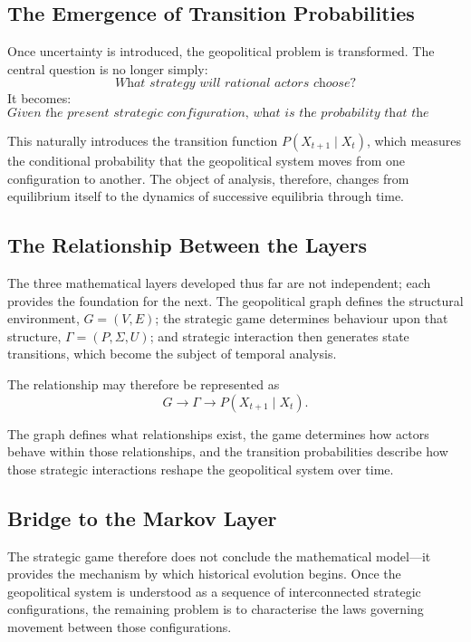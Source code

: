 \documentclass[11pt,openany]{book}
\theoremstyle{plain}
\theoremstyle{definition}
\begin{document}
\subsection*{The Emergence of Transition Probabilities}

Once uncertainty is introduced, the geopolitical problem is transformed. The central question is no longer simply:
\[
\textit{What strategy will rational actors choose?}
\]
It becomes:
\[
\textit{Given the present strategic configuration, what is the probability that the system evolves into each admissible future state?}
\]

This naturally introduces the transition function \(P(X_{t+1}\mid X_t)\), which measures the conditional probability that the geopolitical system moves from one configuration to another. The object of analysis, therefore, changes from equilibrium itself to the dynamics of successive equilibria through time.

\subsection*{The Relationship Between the Layers}

The three mathematical layers developed thus far are not independent; each provides the foundation for the next. The geopolitical graph defines the structural environment, \(G=(V,E)\); the strategic game determines behaviour upon that structure, \(\Gamma=(P,\Sigma,U)\); and strategic interaction then generates state transitions, which become the subject of temporal analysis.

The relationship may therefore be represented as
\[
\boxed{
G \longrightarrow \Gamma \longrightarrow P(X_{t+1}\mid X_t).
}
\]

The graph defines what relationships exist, the game determines how actors behave within those relationships, and the transition probabilities describe how those strategic interactions reshape the geopolitical system over time.

\subsection*{Bridge to the Markov Layer}

The strategic game therefore does not conclude the mathematical model—it provides the mechanism by which historical evolution begins. Once the geopolitical system is understood as a sequence of interconnected strategic configurations, the remaining problem is to characterise the laws governing movement between those configurations.
\end{document}
